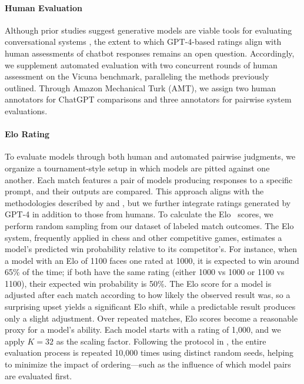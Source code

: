 \paragraph{Human Evaluation} Although prior studies suggest generative models are viable tools for evaluating conversational systems \citep{fu2023gptscore}, the extent to which GPT-4-based ratings align with human assessments of chatbot responses remains an open question. Accordingly, we supplement automated evaluation with two concurrent rounds of human assessment on the Vicuna benchmark, paralleling the methods previously outlined. Through Amazon Mechanical Turk (AMT), we assign two human annotators for ChatGPT comparisons and three annotators for pairwise system evaluations.

\paragraph{Elo Rating} To evaluate models through both human and automated pairwise judgments, we organize a tournament-style setup in which models are pitted against one another. Each match features a pair of models producing responses to a specific prompt, and their outputs are compared. This approach aligns with the methodologies described by \citet{bai2022training} and \citet{vicuna2023}, but we further integrate ratings generated by GPT-4 in addition to those from humans. To calculate the Elo~\citep{elo1967proposed,elo1978rating} scores, we perform random sampling from our dataset of labeled match outcomes. The Elo system, frequently applied in chess and other competitive games, estimates a model's predicted win probability relative to its competitor’s. For instance, when a model with an Elo of 1100 faces one rated at 1000, it is expected to win around 65\% of the time; if both have the same rating (either 1000 vs 1000 or 1100 vs 1100), their expected win probability is 50\%. The Elo score for a model is adjusted after each match according to how likely the observed result was, so a surprising upset yields a significant Elo shift, while a predictable result produces only a slight adjustment. Over repeated matches, Elo scores become a reasonable proxy for a model’s ability. Each model starts with a rating of 1,000, and we apply $K=32$ as the scaling factor. Following the protocol in \citet{vicuna2023}, the entire evaluation process is repeated 10,000 times using distinct random seeds, helping to minimize the impact of ordering—such as the influence of which model pairs are evaluated first.

